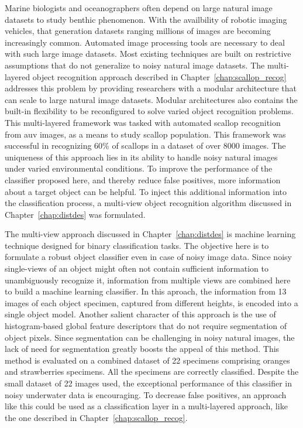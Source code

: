 \documentclass {udthesis}
\begin{document}
Marine biologists and oceanographers often depend on large natural image datasets to study benthic phenomenon. With the availbility of robotic imaging vehicles, that generation datasets ranging millions of images are becoming increasingly common. Automated image processing tools are necessary to deal with such large image datasets. Most existing techniques are built on restrictive assumptions that do not generalize to noisy natural image datasets. The multi-layered object recognition approach described in Chapter~\ref{chap:scallop_recog} addresses this problem by providing researchers with a modular architecture that can scale to large natural image datasets. Modular architectures also contains the built-in flexibility to be reconfigured to solve varied object recognition problems.
This multi-layered framework was tasked with automated scallop recognition from \gls{auv} images, as a means to study scallop population. 
This framework was successful in recognizing 60\% of scallops in a dataset of over 8000 images.
The uniqueness of this approach lies in its ability to handle noisy natural images under varied environmental conditions.
To improve the performance of the classifier proposed here, and thereby reduce false positives, more information about a target object can be helpful.
To inject this additional information into the classification process, a multi-view object recognition algorithm discussed in Chapter~\ref{chap:distdes} was formulated.

The multi-view approach discussed in Chapter~\ref{chap:distdes} is machine learning 
technique designed for binary classification tasks. 
The objective here is to formulate a robust object classifier even in case of noisy image data.
Since noisy single-views of an object might often not contain sufficient information to unambiguously recognize it, information from multiple views are combined 
here to build a machine learning classifier. 
In this aproach, the information from 13 images of each object specimen, captured from different heights, is encoded into a single object model.
Another salient character of this approach is the use of histogram-based global feature descriptors that do not
require segmentation of object pixels. Since segmentation can be challenging in noisy natural images, the lack of need for segmentation greatly boosts the appeal of this method. This method is evaluated on a combined dataset of 22 specimens comprising oranges and strawberries specimens.
All the specimens are correctly classified. Despite the small dataset of 22 images used, the exceptional performance of this classifier in noisy underwater data is encouraging. To decrease false positives, an approach like this could be used as a classification layer in a multi-layered approach, like the one described in Chapter~\ref{chap:scallop_recog}.
\end{document}
